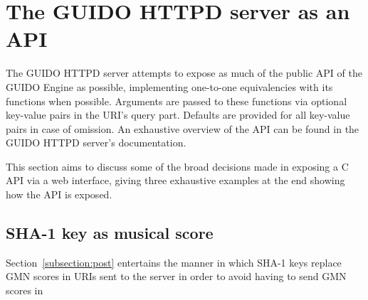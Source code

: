 \documentclass[11pt,a4paper]{article}
\begin{document}

\section{The GUIDO HTTPD server as an API}\label{section:guido-api}
The GUIDO HTTPD server attempts to expose as much of the public API of the GUIDO Engine as possible, implementing one-to-one equivalencies with its functions when possible.  Arguments are passed to these functions via optional key-value pairs in the URI's query part.  Defaults are provided for all key-value pairs in case of omission.  An exhaustive overview of the API can be found in the GUIDO HTTPD server's documentation\cite{guidoweb0.50}.\par
This section aims to discuss some of the broad decisions made in exposing a C API via a web interface, giving three exhaustive examples at the end showing how the API is exposed.

\subsection{SHA-1 key as musical score}
Section~\ref{subsection:post} entertains the manner in which SHA-1 keys replace GMN scores in URIs sent to the server in order to avoid having to send GMN scores in 
\end{document}
